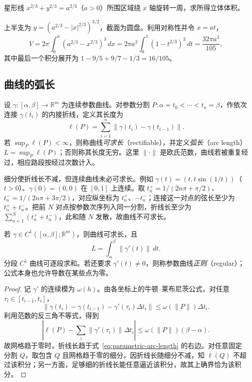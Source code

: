 \documentclass[UTF8,12pt,a4paper,fontset=fandol]{ctexbook}
\begin{document}
\begin{example}
\label{ex:astroid-solid-volume}
星形线 $x^{2/3}+y^{2/3}=a^{2/3}$（$a>0$）所围区域绕 $x$ 轴旋转一周，求所得立体体积。
\end{example}
\begin{solve}
上半支为 $y=(a^{2/3}-|x|^{2/3})^{3/2}$，截面为圆盘。利用对称性并令 $x=at$，
\[
    V=2\pi\int_0^a(a^{2/3}-x^{2/3})^3\,dx
    =2\pi a^3\int_0^1(1-t^{2/3})^3\,dt
    =\frac{32\pi a^3}{105},
\]
其中最后一个积分展开为 $1-9/5+9/7-1/3=16/105$。
\end{solve}

\subsection{曲线的弧长}
\label{subsec:arc-length-of-curves}

\begin{definition}
\label{def:rectifiable-curve-length}
设 $\gamma:[\alpha,\beta]\to\mathbb R^m$ 为连续参数曲线。对参数分割 $P:\alpha=t_0<\cdots<t_n=\beta$，作依次连接 $\gamma(t_i)$ 的内接折线，定义其长度为
\[
    \ell(P)=\sum_{i=1}^n\|\gamma(t_i)-\gamma(t_{i-1})\|.
\]
若 $\sup_P\ell(P)<\infty$，则称曲线\emph{可求长}（rectifiable），并定义\emph{弧长}（arc length）$L=\sup_P\ell(P)$；否则称其长度无穷。这里 $\|\cdot\|$ 是欧氏范数，曲线若被重复经过，相应路段按经过次数计入。
\end{definition}

细分使折线长不减，但连续曲线未必可求长。例如 $\gamma(t)=(t,t\sin(1/t))$（$t>0$）、$\gamma(0)=(0,0)$ 在 $[0,1]$ 上连续。取 $t_n^+=1/(2n\pi+\pi/2)$、$t_n^-=1/(2n\pi+3\pi/2)$，对应纵坐标为 $t_n^+$、$-t_n^-$；连接这一对点的弦长至少为 $t_n^++t_n^-$。把前 $N$ 对点按参数次序列入同一分割，折线长至少为 $\sum_{n=1}^N(t_n^++t_n^-)$，此和随 $N$ 发散，故曲线不可求长。

\begin{theorem}[弧长积分公式]
\label{thm:arc-length-integral}
若 $\gamma\in C^1([\alpha,\beta];\mathbb R^m)$，则曲线可求长，且
\begin{equation}
    L=\int_\alpha^\beta\|\gamma'(t)\|\,dt.
    \label{eq:parametric-arc-length}
\end{equation}
分段 $C^1$ 曲线可逐段求和。若还要求 $\gamma'(t)\neq0$，则称参数曲线\emph{正则}（regular）；公式本身也允许导数在某些点为零。
\end{theorem}
\begin{proof}
记 $\gamma'$ 的连续模为 $\omega(h)$。由各坐标上的牛顿--莱布尼茨公式，对任意 $\tau_i\in[t_{i-1},t_i]$，
\[
    \|\gamma(t_i)-\gamma(t_{i-1})-\gamma'(\tau_i)\Delta t_i\|
    \leq\omega(\|P\|)\Delta t_i.
\]
利用范数的反三角不等式，得到
\[
    \left|\ell(P)-\sum_i\|\gamma'(\tau_i)\|\Delta t_i\right|
    \leq\omega(\|P\|)(\beta-\alpha).
\]
故网格趋于零时，折线长趋于式~\eqref{eq:parametric-arc-length} 的右边。对任意固定分割 $Q$，取包含 $Q$ 且网格趋于零的细分，因折线长随细分不减，知 $\ell(Q)$ 不超过该积分；另一方面，足够细的折线长能任意逼近该积分，故其上确界恰为该积分。
\end{proof}
\end{document}
